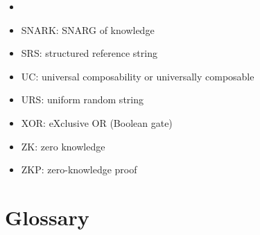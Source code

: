 \begin{multicols}{2}
\begin{itemize}
\item {}
\item SNARK: SNARG of knowledge
\item SRS: structured reference string
\item UC: universal composability or universally composable
\item URS: uniform random string
\item XOR: eXclusive OR (Boolean gate)
\item ZK: zero knowledge
\item ZKP: zero-knowledge proof
\end{itemize}
\end{multicols}


\section[Glossary]{Glossary}
\label{app:glossary}


